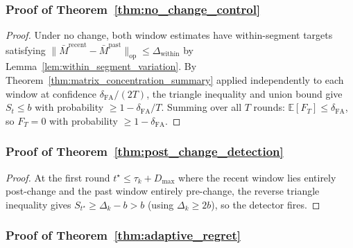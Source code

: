 \documentclass{article}
\newcommand{\E}{\mathbb{E}}
\newcommand{\op}{\mathrm{op}}
\begin{document}
\subsubsection{Proof of Theorem~\ref{thm:no_change_control}}
\label{proof:no_change_control}

\begin{proof}
Under no change, both window estimates have within-segment targets satisfying $\|\bar M^{\mathrm{recent}} - \bar M^{\mathrm{past}}\|_{\op} \le \Delta_{\mathrm{within}}$ by Lemma~\ref{lem:within_segment_variation}.
By Theorem~\ref{thm:matrix_concentration_summary} applied independently to each window at confidence $\delta_{\mathrm{FA}}/(2T)$, the triangle inequality and union bound give $S_t \le b$ with probability $\ge 1 - \delta_{\mathrm{FA}}/T$.
Summing over all $T$ rounds: $\E[F_T] \le \delta_{\mathrm{FA}}$, so $F_T = 0$ with probability $\ge 1 - \delta_{\mathrm{FA}}$.
\end{proof}

\subsubsection{Proof of Theorem~\ref{thm:post_change_detection}}
\label{proof:post_change_detection}

\begin{proof}
At the first round $t^\star \le \tau_k + D_{\max}$ where the recent window lies entirely post-change and the past window entirely pre-change, the reverse triangle inequality gives $S_{t^\star} \ge \Delta_k - b > b$ (using $\Delta_k \ge 2b$), so the detector fires.
\end{proof}

\subsubsection{Proof of Theorem~\ref{thm:adaptive_regret}}
\label{proof:adaptive_regret}
\end{document}

